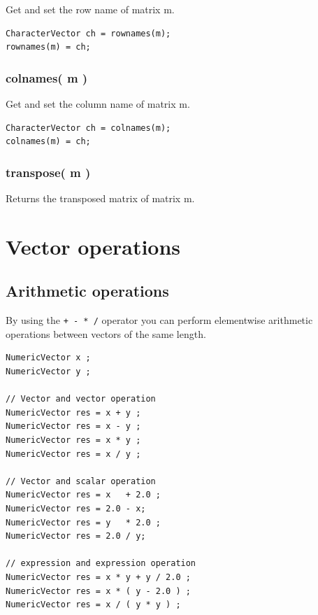 \documentclass[
]{book}
\begin{document}
Get and set the row name of matrix m.

\begin{verbatim}
CharacterVector ch = rownames(m);
rownames(m) = ch;
\end{verbatim}

\hypertarget{colnames-m}{%
\subsection{colnames( m )}\label{colnames-m}}

Get and set the column name of matrix m.

\begin{verbatim}
CharacterVector ch = colnames(m);
colnames(m) = ch;
\end{verbatim}

\hypertarget{transpose-m}{%
\subsection{transpose( m )}\label{transpose-m}}

Returns the transposed matrix of matrix m.

\hypertarget{vector-operations}{%
\chapter{Vector operations}\label{vector-operations}}

\hypertarget{arithmetic-operations}{%
\section{Arithmetic operations}\label{arithmetic-operations}}

By using the \texttt{+\ -\ *\ /} operator you can perform elementwise arithmetic operations between vectors of the same length.

\begin{verbatim}
NumericVector x ;
NumericVector y ;

// Vector and vector operation
NumericVector res = x + y ;
NumericVector res = x - y ;
NumericVector res = x * y ;
NumericVector res = x / y ;

// Vector and scalar operation
NumericVector res = x   + 2.0 ;
NumericVector res = 2.0 - x;
NumericVector res = y   * 2.0 ;
NumericVector res = 2.0 / y;

// expression and expression operation
NumericVector res = x * y + y / 2.0 ;
NumericVector res = x * ( y - 2.0 ) ;
NumericVector res = x / ( y * y ) ;
\end{verbatim}
\end{document}
